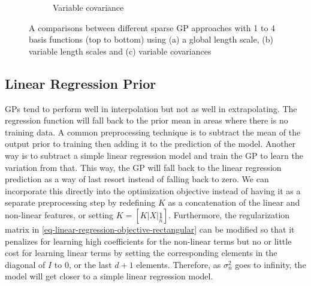 \documentclass[useAMS,usenatbib,fleqn]{mn2e}
\begin{document}
\begin{figure}
\begin{subfigure}[b]{0.3\columnwidth}
                \caption{Variable covariance}
        \end{subfigure}
               
        \caption{A comparisons between different sparse GP approaches with 1 to 4 basis functions (top to bottom) using (a) a global length scale, (b) variable length scales and (c) variable covariances }
        \label{fig-toy-comparison}
\end{figure}

\subsection{Linear Regression Prior}

GPs tend to perform well in interpolation but not as well in extrapolating. The regression function will fall back to the prior mean in areas where there is no training data. A common preprocessing technique is to subtract the mean of the output prior to training then adding it to the prediction of the model. Another way is to subtract a simple linear regression model and train the GP to learn the variation from that. This way, the GP will fall back to the linear regression prediction as a way of last resort instead of falling back to zero. We can incorporate this directly into the optimization objective instead of having it as a separate preprocessing step by redefining $K$ as a concatenation of the linear and non-linear features, or setting $K=[K|X|\underset{n}{1}]$. Furthermore, the regularization matrix in \eqref{eq-linear-regression-objective-rectangular} can be modified so that it penalizes for learning high coefficients for the non-linear terms but no or little cost for learning linear terms by setting the corresponding elements in the diagonal of $I$ to 0, or the last $d+1$ elements. Therefore, as $\sigma_{n}^{2}$ goes to infinity, the model will get closer to a simple linear regression model.
\end{document}
